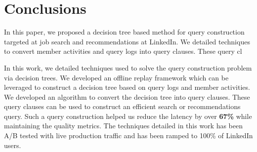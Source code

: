 \section{Conclusions}
In this paper, we proposed a decision tree based method for query construction
targeted at job search and recommendations at LinkedIn. We detailed techniques
to convert member activities and query logs into query clauses. These query cl

In this work, we detailed techniques used to solve the query construction problem 
via decision trees. We developed an offline replay framework which can be
leveraged to construct a decision tree based on query logs and member
activities. We developed an algorithm to convert the decision tree into query
clauses. These query clauses can be used to construct an efficient search or
recommendations query. Such a query construction helped us reduce the latency
by over {\bf 67\%} while maintaining the quality metrics. The techniques
detailed in this work has been A/B tested with live production traffic and has
been ramped to 100\% of LinkedIn users.
